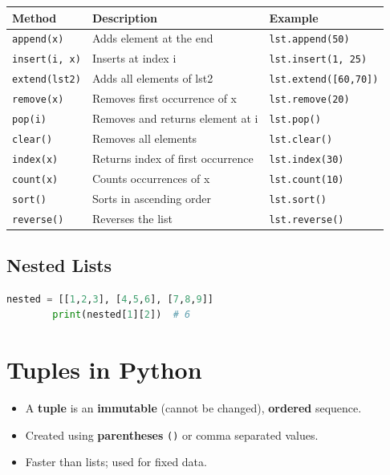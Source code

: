 \documentclass{article}
\begin{document}
	\begin{tabular}{|l|l|l|}
		\hline
		\textbf{Method} & \textbf{Description} & \textbf{Example} \\
		\hline
		\texttt{append(x)} & Adds element at the end & \texttt{lst.append(50)} \\
		\texttt{insert(i, x)} & Inserts at index i & \texttt{lst.insert(1, 25)} \\
		\texttt{extend(lst2)} & Adds all elements of lst2 & \texttt{lst.extend([60,70])} \\
		\texttt{remove(x)} & Removes first occurrence of x & \texttt{lst.remove(20)} \\
		\texttt{pop(i)} & Removes and returns element at i & \texttt{lst.pop()} \\
		\texttt{clear()} & Removes all elements & \texttt{lst.clear()} \\
		\texttt{index(x)} & Returns index of first occurrence & \texttt{lst.index(30)} \\
		\texttt{count(x)} & Counts occurrences of x & \texttt{lst.count(10)} \\
		\texttt{sort()} & Sorts in ascending order & \texttt{lst.sort()} \\
		\texttt{reverse()} & Reverses the list & \texttt{lst.reverse()} \\
		\hline
	\end{tabular}
	
	\subsection{Nested Lists}
	\begin{lstlisting}[language=Python]
		nested = [[1,2,3], [4,5,6], [7,8,9]]
		print(nested[1][2])  # 6
	\end{lstlisting}
	
	\section{Tuples in Python}
	
	\begin{itemize}
		\item A \textbf{tuple} is an \textbf{immutable} (cannot be changed), \textbf{ordered} sequence.
		\item Created using \textbf{parentheses} \texttt{()} or comma separated values.
		\item Faster than lists; used for fixed data.
	\end{itemize}
	
\end{document}

